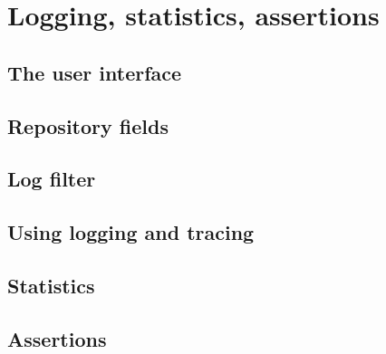 \section{Logging, statistics, assertions}
\label{section:logging}

\subsection{The user interface}

\subsection{Repository fields}

\subsection{Log filter}

\subsection{Using logging and tracing}

\subsection{Statistics}


\subsection{Assertions}



